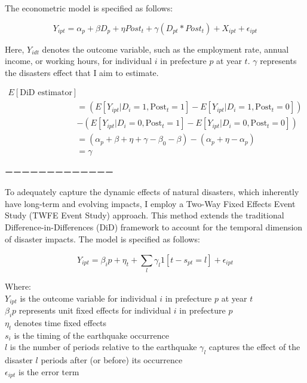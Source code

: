 \documentclass[12pt,halfline,a4paper]{ouparticle}
\begin{document}
The econometric model is specified as follows:

\begin{equation}
Y_{ipt} = \alpha_{p} + \beta D_{p} + \eta Post_{t} + \gamma (D_{pt} * Post_{t}) + X_{ipt} + \epsilon_{ipt}
\end{equation}

Here, \( Y_{idt} \) denotes the outcome variable, such as the employment rate, annual income, or working hours, for individual \( i \) in prefecture \( p \) at year \( t \). \( \gamma \) represents the disasters effect that I aim to estimate. 


\begin{equation}
\begin{aligned}
E[\text{DiD estimator}] \\
&= (E[Y_{ipt}|D_i = 1, \text{Post}_t = 1] - E[Y_{ipt}|D_i = 1, \text{Post}_t = 0]) \\
&- (E[Y_{ipt}|D_i = 0, \text{Post}_t = 1] - E[Y_{ipt}|D_i = 0, \text{Post}_t = 0]) \\
&= (\alpha_{p} + \beta + \eta + \gamma - \beta_0 - \beta) - (\alpha_{p} + \eta - \alpha_{p}) \\
&= \gamma
\end{aligned}
\end{equation}








ーーーーーーーーーーーーー

To adequately capture the dynamic effects of natural disasters, which inherently have long-term and evolving impacts, I employ a Two-Way Fixed Effects Event Study (TWFE Event Study) approach. This method extends the traditional Difference-in-Differences (DiD) framework to account for the temporal dimension of disaster impacts. The model is specified as follows:

\begin{equation}
Y_{ipt} = \beta_ip + \eta_t + \sum_{l}^{} \gamma_l 1 [t-s_{pt} = l] + \epsilon_{ipt}
\end{equation}

Where: \\
$Y_{ipt}$ is the outcome variable for individual \( i \) in prefecture \( p \) at year \( t \) \\
$\beta_ip$ represents unit fixed effects for individual \( i \) in prefecture \( p \) \\
$\eta_t$ denotes time fixed effects \\
$s_{i}$ is the timing of the earthquake occurrence \\
$l$ is the number of periods relative to the earthquake
$\gamma_l$ captures the effect of the disaster $l$ periods after (or before) its occurrence \\
$\epsilon_{ipt}$ is the error term
\end{document}
